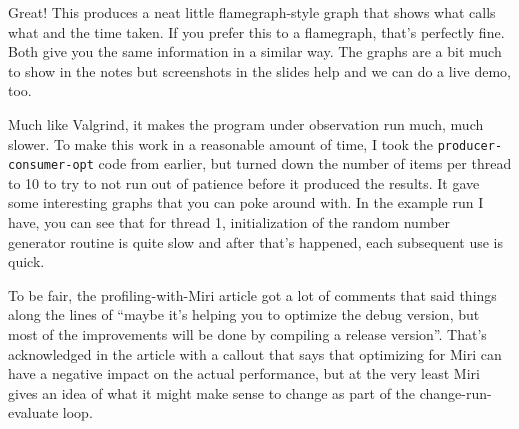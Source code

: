 Great! This produces a neat little flamegraph-style graph that shows what calls what and the time taken. If you prefer this to a flamegraph, that's perfectly fine. Both give you the same information in a similar way. The graphs are a bit much to show in the notes but screenshots in the slides help and we can do a live demo, too.

Much like Valgrind, it makes the program under observation run much, much slower. To make this work in a reasonable amount of time, I took the \texttt{producer-consumer-opt} code from earlier, but turned down the number of items per thread to 10 to try to not run out of patience before it produced the results. It gave some interesting graphs that you can poke around with. In the example run I have, you can see that for thread 1, initialization of the random number generator routine is quite slow and after that's happened, each subsequent use is quick. 


To be fair, the profiling-with-Miri article got a lot of comments that said things along the lines of ``maybe it's helping you to optimize the debug version, but most of the improvements will be done by compiling a release version''. That's acknowledged in the article with a callout that says that optimizing for Miri can have a negative impact on the actual performance, but at the very least Miri gives an idea of what it might make sense to change as part of the change-run-evaluate loop.





